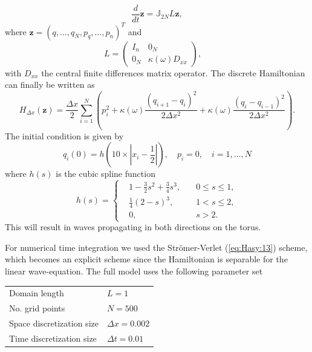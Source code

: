 \begin{equation} \label{eq:NuRe:5}
	\frac{d}{dt} \mathbf z = \mathbb{J}_{2N} L\mathbf z,
\end{equation}
where $\mathbf z=(q,\dots,q_N,p_q,\dots,p_n)^T$ and
\begin{equation} \label{eq:NuRe:6}
L = 
\begin{pmatrix}
	I_n & 0_N \\
	0_N & \kappa(\omega)D_{xx}
\end{pmatrix},\quad 
\end{equation}
with $D_{xx}$ the central finite differences matrix operator. The discrete Hamiltonian can finally be written as
\begin{equation} \label{eq:NuRe:7}
	H_{\Delta x}(\mathbf z) = \frac{\Delta x}2 \sum_{i=1}^{N} \left( p_i^2 + \kappa(\omega) \frac{(q_{i+1} - q_i)^2}{2\Delta x ^ 2} + \kappa(\omega) \frac{(q_{i} - q_{i-1})^2}{2\Delta x ^ 2} \right).
\end{equation}
The initial condition is given by
\begin{equation} \label{eq:NuRe:8}
	q_i(0) = h( 10\times|x_i - \frac{1}{2}| ), \quad p_i = 0, \quad i=1,\dots,N
\end{equation}
where $h(s)$ is the cubic spline function
\begin{equation} \label{eq:NuRe:9}
h(s) = 
\left\{
\begin{aligned}
& 1 - \frac{3}{2}s^2 + \frac{3}{4}s^3, \quad & 0\leq s \leq 1, \\
& \frac{1}{4}(2-s)^3, & 1< s \leq 2, \\
& 0, & s > 2.
\end{aligned}
\right.
\end{equation}
This will result in waves propagating in both directions on the torus.

For numerical time integration we used the Str\"omer-Verlet (\ref{eq:Hasy:13}) scheme, which becomes an explicit scheme since the Hamiltonian is separable for the linear wave-equation. The full model uses the following parameter set \vspace{0.5cm}
\begin{center}
\begin{tabular}{|l|l|}
\hline
Domain length & $L = 1$ \\
No. grid points & $N = 500$ \\
Space discretization size & $\Delta x = 0.002$ \\
Time discretization size & $\Delta t = 0.01$ \\
\hline
\end{tabular}
\end{center}
\vspace{0.5cm}

